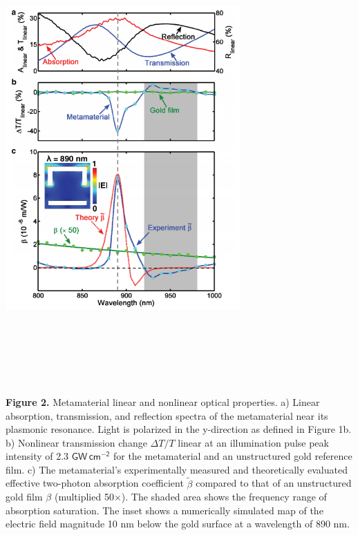 \documentclass[]{article}
\begin{document}
\includegraphics[width=9cm,height=18cm]{image/001_02.png}\\
\textbf{Figure 2.} Metamaterial linear and nonlinear optical properties.
a) Linear absorption, transmission, and reflection spectra of the
metamaterial near its plasmonic resonance. Light is polarized in the
y-direction as defined in Figure 1b. b) Nonlinear transmission change
\( \Delta T/T\) linear at an illumination pulse peak intensity of 2.3
\( \mathsf{GW\,cm^{-2}}\) for the metamaterial and an unstructured
gold reference film. c) The metamaterial's experimentally measured and
theoretically evaluated effective two-photon absorption coefficient
\( \tilde \beta\) compared to that of an unstructured gold film
\( \beta\) (multiplied 50×). The shaded area shows the frequency
range of absorption saturation. The inset shows a numerically simulated
map of the electric field magnitude 10 nm below the gold surface at a
wavelength of 890 nm.
\end{document}
